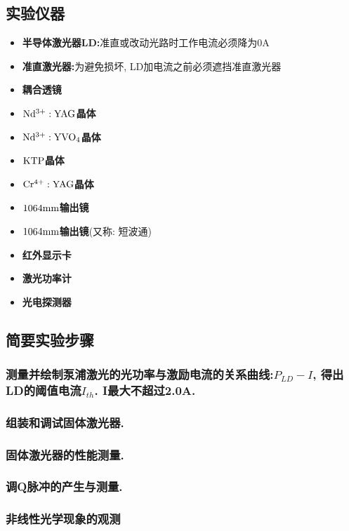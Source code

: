 \documentclass[a4paper]{article}
\begin{document}
\subsection{实验仪器}\label{sub:sysover}
\begin{itemize}
\item{\textbf{半导体激光器LD:}准直或改动光路时工作电流必须降为0A}
\item{\textbf{准直激光器:}为避免损坏, LD加电流之前必须遮挡准直激光器}
\item{\textbf{耦合透镜}}
\item{\textbf{$\rm Nd^{3+}:YAG$晶体}}
\item{\textbf{$\rm Nd^{3+}:YVO_4$晶体}}
\item{\textbf{$\rm KTP$晶体}}
\item{\textbf{$\rm Cr^{4+}:YAG$晶体}}
\item{\textbf{$\rm 1064mm$输出镜}}
\item{\textbf{$\rm 1064mm$输出镜}(又称: 短波通)}
\item{\textbf{红外显示卡}}
\item{\textbf{激光功率计}}
\item{\textbf{光电探测器}}
\end{itemize}

\subsection{简要实验步骤}\label{sub:Interface}
\subsubsection{测量并绘制泵浦激光的光功率与激励电流的关系曲线:$P_{LD}-I$, 得出LD的阈值电流$I_{th}$. I最大不超过2.0A.}
\subsubsection{组装和调试固体激光器.}
\subsubsection{固体激光器的性能测量.}
\subsubsection{调Q脉冲的产生与测量.}
\subsubsection{非线性光学现象的观测}
\end{document}
